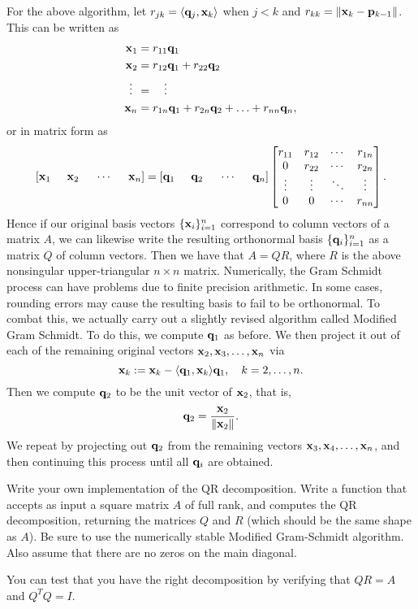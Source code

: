 For the above algorithm, let $r_{j k} = \langle {\bf q}_j, {\bf x}_k\rangle$ when $j < k$ and
$r_{kk} = \|{\bf x}_k-{\bf p}_{k-1}\|$.
This can be written as
\begin{align*}
{\bf x}_1 &= r_{1 1} {\bf q}_1\\
{\bf x}_2 &= r_{1 2} {\bf q}_1 + r_{2 2} {\bf q}_2\\
\vdots \:\: &= \quad \vdots\\
{\bf x}_n &= r_{1 n} {\bf q}_1 + r_{2 n} {\bf q}_2 + \ldots + r_{n n} {\bf q}_{n},
\end{align*}
or in matrix form as
\[
[{\bf x}_1 \hspace{5mm} {\bf x}_2 \hspace{5mm} \cdots \hspace{5mm} {\bf x}_n]
=
[{\bf q}_1 \hspace{5mm} {\bf q}_2 \hspace{5mm} \cdots \hspace{5mm} {\bf q}_n]
\begin{bmatrix}
r_{1 1} & r_{1 2} & \cdots & r_{1 n}\\
0 & r_{2 2} & \cdots & r_{2 n}\\
\vdots & \vdots & \ddots & \vdots\\
0 & 0 & \cdots & r_{n n}
\end{bmatrix}.
\]
Hence if our original basis vectors $\{{\bf x}_i\}_{i=1}^n$ correspond to column
vectors of a matrix $A$, we can likewise write the resulting
orthonormal basis $\{{\bf q}_i\}_{i=1}^n$ as a matrix $Q$ of column
vectors.  Then we have that $A = Q R$, where $R$ is the above
nonsingular upper-triangular $n\times n$ matrix.
Numerically, the Gram Schmidt process can have problems due to
finite precision arithmetic. In some cases, rounding errors may cause
the resulting basis to fail to be orthonormal. To combat this, we
actually carry out a slightly revised algorithm called Modified Gram
Schmidt.  To do this, we compute ${\bf q}_1$ as before.  We then project
it out of each of the remaining original vectors
${\bf x}_2,{\bf x}_3,\ldots,{\bf x}_n$ via
\[
{\bf x}_k := {\bf x}_k - \langle {\bf q}_1,{\bf x}_{k} \rangle {\bf q}_1,\quad k=2,\ldots,n.
\]
Then we compute ${\bf q}_2$ to be the unit vector of ${\bf x}_2$, that is,
\[
{\bf q}_2 = \frac{{\bf x}_2}{\|{\bf x}_2\|}.
\]
We repeat by projecting out ${\bf q}_2$ from the remaining vectors
${\bf x}_3,{\bf x}_4,\ldots,{\bf x}_n$, and then continuing this process until
all ${\bf q}_i$ are obtained.

\begin{problem}
\label{prob:QR}
Write your own implementation of the QR decomposition.
Write a function  that accepts as input a square matrix $A$ of full rank, 
and computes the QR decomposition, returning the matrices 
$Q$ and $R$ (which should be the same shape as $A$).
Be sure to use the numerically stable Modified Gram-Schmidt algorithm.
Also assume that there are no zeros on the main diagonal.

You can test that you have the right decomposition by verifying that $QR=A$ and $Q^T Q = I$.
\end{problem}

